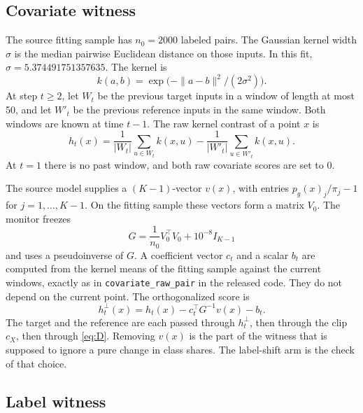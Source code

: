 \documentclass[11pt,a4paper]{article}
\theoremstyle{definition}
\newcommand{\1}{\mathbf{1}}
\begin{document}
\subsection{Covariate witness}

The source fitting sample has \(n_0=2000\) labeled pairs. The Gaussian kernel width \(\sigma\) is the median pairwise Euclidean distance on those inputs. In this fit, \(\sigma=5.374491751357635\). The kernel is
\begin{equation}
k(a,b)=\exp\big(-\|a-b\|^2/(2\sigma^2)\big).
\label{eq:kernel}
\end{equation}
At step \(t\ge 2\), let \(W_t\) be the previous target inputs in a window of length at most 50, and let \(W'_t\) be the previous reference inputs in the same window. Both windows are known at time \(t-1\). The raw kernel contrast of a point \(x\) is
\begin{equation}
h_t(x)=\frac{1}{|W_t|}\sum_{u\in W_t}k(x,u)
-\frac{1}{|W'_t|}\sum_{u\in W'_t}k(x,u).
\label{eq:hraw}
\end{equation}
At \(t=1\) there is no past window, and both raw covariate scores are set to 0.

The source model supplies a \((K-1)\)-vector \(v(x)\), with entries \(p_g(x)_j/\pi_j-1\) for \(j=1,\ldots,K-1\). On the fitting sample these vectors form a matrix \(V_0\). The monitor freezes
\begin{equation}
G=\frac{1}{n_0}V_0^\top V_0+10^{-8}I_{K-1}
\label{eq:G}
\end{equation}
and uses a pseudoinverse of \(G\). A coefficient vector \(c_t\) and a scalar \(b_t\) are computed from the kernel means of the fitting sample against the current windows, exactly as in \texttt{covariate\_raw\_pair} in the released code. They do not depend on the current point. The orthogonalized score is
\begin{equation}
h^\perp_t(x)=h_t(x)-c_t^\top G^{-1}v(x)-b_t.
\label{eq:hperp}
\end{equation}
The target and the reference are each passed through \(h^\perp_t\), then through the clip \(c_X\), then through \eqref{eq:D}. Removing \(v(x)\) is the part of the witness that is supposed to ignore a pure change in class shares. The label-shift arm is the check of that choice.

\subsection{Label witness}
\end{document}
